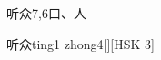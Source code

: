 \begin{entry}{听众}{7,6}{⼝、⼈}
  \begin{phonetics}{听众}{ting1 zhong4}[][HSK 3]
  \end{phonetics}
\end{entry}
